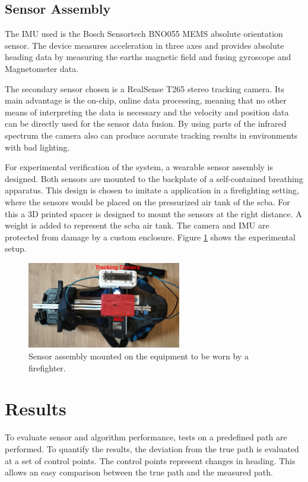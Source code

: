 \documentclass[engproc,conferenceproceedings,submit,pdftex,moreauthors]{Definitions/mdpi}
\begin{document}
\subsection{Sensor Assembly}
 
The IMU used  is the Bosch Sensortech BNO055 MEMS absolute orientation sensor. The device measures acceleration in three axes and provides absolute heading data by measuring the earths magnetic field and fusing gyroscope and Magnetometer data. 
  
The secondary sensor chosen is a RealSense T265 stereo tracking camera. Its main advantage is the on-chip, online data processing, meaning that no other means of interpreting the data is necessary and the velocity and position data can be directly used for the sensor data fusion. By using parts of the infrared spectrum the camera also can produce accurate tracking results in environments with bad lighting.
  
For experimental verification of the system, a wearable sensor assembly is designed. Both sensors are mounted to the backplate of a self-contained breathing apparatus. This design is chosen to imitate a application in a firefighting setting, where the sensors would be placed on the pressurized air tank of the scba. For this a 3D printed spacer is designed to mount the sensors at the right distance. A weight is added to represent the scba air tank. The camera and IMU are protected from damage by a custom enclosure.  Figure \ref{fig:Assembly} shows the experimental setup.

\begin{figure}
	\centering
	\includegraphics[width=0.6\textwidth]{Assembly.jpg}
	\caption{Sensor assembly mounted on the equipment to be worn by a firefighter.}
	\label{fig:Assembly}
\end{figure}


\section{Results}
To evaluate sensor and algorithm performance, tests on a predefined path are performed. To quantify the results, the deviation from the true path is evaluated at a set of control points. The control points represent changes in heading. This allows an easy comparison between the true path and the measured path.
\end{document}
